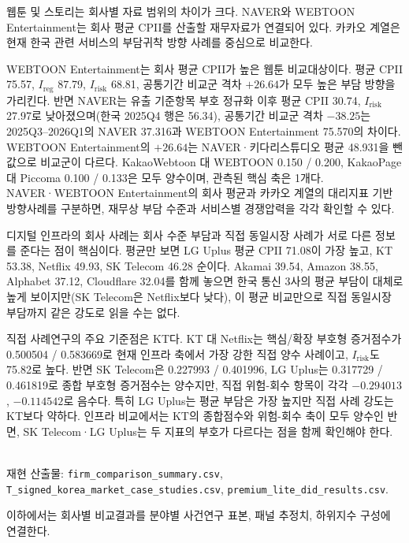 \documentclass[11pt,a4paper]{report}
\begin{document}
웹툰 및 스토리는 회사별 자료 범위의 차이가 크다. NAVER와 WEBTOON Entertainment는 회사 평균 CPII를 산출할 재무자료가 연결되어 있다. 카카오 계열은 현재 한국 관련 서비스의 부담귀착 방향 사례를 중심으로 비교한다.

WEBTOON Entertainment는 회사 평균 CPII가 높은 웹툰 비교대상이다. 평균 CPII 75.57, $I_{\mathrm{reg}}$ 87.79, $I_{\mathrm{risk}}$ 68.81, 공통기간 비교군 격차 $+26.64$가 모두 높은 부담 방향을 가리킨다. 반면 NAVER는 유출 기준항목 부호 정규화 이후 평균 CPII 30.74, $I_{\mathrm{risk}}$ 27.97로 낮아졌으며(한국 2025Q4 행은 56.34), 공통기간 비교군 격차 $-38.25$는 2025Q3--2026Q1의 NAVER 37.316과 WEBTOON Entertainment 75.570의 차이다. WEBTOON Entertainment의 $+26.64$는 NAVER·키다리스튜디오 평균 48.931을 뺀 값으로 비교군이 다르다. KakaoWebtoon 대 WEBTOON 0.150 / 0.200, KakaoPage 대 Piccoma 0.100 / 0.133은 모두 양수이며, 관측된 핵심 축은 1개다. NAVER·WEBTOON Entertainment의 회사 평균과 카카오 계열의 대리지표 기반 방향사례를 구분하면, 재무상 부담 수준과 서비스별 경쟁압력을 각각 확인할 수 있다.

디지털 인프라의 회사 사례는 회사 수준 부담과 직접 동일시장 사례가 서로 다른 정보를 준다는 점이 핵심이다. 평균만 보면 LG Uplus 평균 CPII 71.08이 가장 높고, KT 53.38, Netflix 49.93, SK Telecom 46.28 순이다. Akamai 39.54, Amazon 38.55, Alphabet 37.12, Cloudflare 32.04를 함께 놓으면 한국 통신 3사의 평균 부담이 대체로 높게 보이지만(SK Telecom은 Netflix보다 낮다), 이 평균 비교만으로 직접 동일시장 부담까지 같은 강도로 읽을 수는 없다.

직접 사례연구의 주요 기준점은 KT다. KT 대 Netflix는 핵심/확장 부호형 증거점수가 0.500504 / 0.583669로 현재 인프라 축에서 가장 강한 직접 양수 사례이고, $I_{\mathrm{risk}}$도 75.82로 높다. 반면 SK Telecom은 0.227993 / 0.401996, LG Uplus는 0.317729 / 0.461819로 종합 부호형 증거점수는 양수지만, 직접 위험-회수 항목이 각각 $-0.294013$, $-0.114542$로 음수다. 특히 LG Uplus는 평균 부담은 가장 높지만 직접 사례 강도는 KT보다 약하다. 인프라 비교에서는 KT의 종합점수와 위험-회수 축이 모두 양수인 반면, SK Telecom·LG Uplus는 두 지표의 부호가 다르다는 점을 함께 확인해야 한다.

\\
재현 산출물: \texttt{firm\_comparison\_summary.csv}, \texttt{T\_signed\_korea\_market\_case\_studies.csv}, \texttt{premium\_lite\_did\_results.csv}.

이하에서는 회사별 비교결과를 분야별 사건연구 표본, 패널 추정치, 하위지수 구성에 연결한다.
\end{document}
